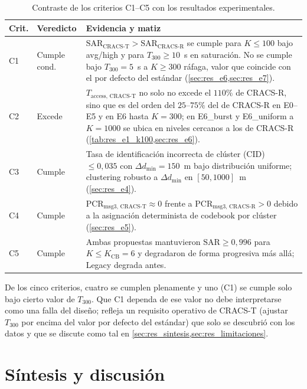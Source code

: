 \begin{table}[H]
\centering
\caption{Contraste de los criterios C1--C5 con los resultados experimentales.}
\label{tab:res_criterios}
\small
\renewcommand{\arraystretch}{1.18}
\begin{tabularx}{\linewidth}{@{}l l X@{}}
\toprule
\textbf{Crit.} & \textbf{Veredicto} & \textbf{Evidencia y matiz} \\
\midrule
C1 & Cumple cond. & $\mathrm{SAR}_{\text{CRACS-T}} > \mathrm{SAR}_{\text{CRACS-R}}$ se cumple para $K \leq 100$ bajo avg/high y para $T_{300} \geq 10$~s en saturación. No se cumple bajo $T_{300}=5$~s a $K \geq 300$ ráfaga, valor que coincide con el por defecto del estándar (\cref{sec:res_e6,sec:res_e7}). \\
C2 & Excede & $T_{\text{access, CRACS-T}}$ no solo no excede el $110\%$ de CRACS-R, sino que es del orden del $25$--$75\%$ del de CRACS-R en E0--E5 y en E6 hasta $K=300$; en E6\_burst y E6\_uniform a $K=1000$ se ubica en niveles cercanos a los de CRACS-R (\cref{tab:res_e1_k100,sec:res_e6}). \\
C3 & Cumple & Tasa de identificación incorrecta de clúster (CID) $\leq 0{,}035$ con $\Delta d_{\min}=150$~m bajo distribución uniforme; clustering robusto a $\Delta d_{\min}$ en $[50, 1000]$~m (\cref{sec:res_e4}). \\
C4 & Cumple & $\mathrm{PCR}_{\text{msg3, CRACS-T}} \approx 0$ frente a $\mathrm{PCR}_{\text{msg3, CRACS-R}} > 0$ debido a la asignación determinista de codebook por clúster (\cref{sec:res_e5}). \\
C5 & Cumple & Ambas propuestas mantuvieron $\mathrm{SAR} \geq 0{,}996$ para $K \leq K_{\text{CB}}=6$ y degradaron de forma progresiva más allá; Legacy degrada antes. \\
\bottomrule
\end{tabularx}
\end{table}

De los cinco criterios, cuatro se cumplen plenamente y uno (C1) se cumple solo bajo cierto valor de $T_{300}$. Que C1 dependa de ese valor no debe interpretarse como una falla del diseño; refleja un requisito operativo de CRACS-T (ajustar $T_{300}$ por encima del valor por defecto del estándar) que solo se descubrió con los datos y que se discute como tal en \cref{sec:res_sintesis,sec:res_limitaciones}.

\section{Síntesis y discusión}
\label{sec:res_sintesis}

